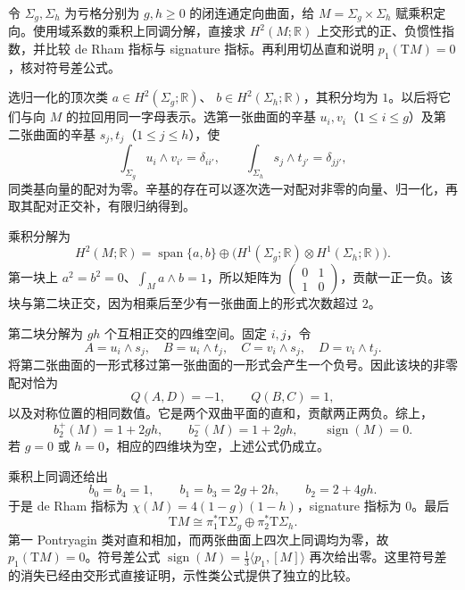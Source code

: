 \begin{optionalexercise}\label{g3:ex:surface-product-signature}
	令 \(\Sigma_g,\Sigma_h\) 为亏格分别为 \(g,h\ge0\) 的闭连通定向曲面，给 \(M=\Sigma_g\times\Sigma_h\) 赋乘积定向。使用域系数的乘积上同调分解，直接求 \(H^2(M;\mathbb R)\) 上交形式的正、负惯性指数，并比较 de Rham 指标与 signature 指标。再利用切丛直和说明 \(p_1(\mathrm TM)=0\)，核对符号差公式。
\end{optionalexercise}
\begin{solution}
	选归一化的顶次类 \(a\in H^2(\Sigma_g;\mathbb R)\)、
	\(b\in H^2(\Sigma_h;\mathbb R)\)，其积分均为 \(1\)。以后将它们与向 \(M\) 的拉回用同一字母表示。选第一张曲面的辛基
	\(u_i,v_i\)（\(1\le i\le g\)）及第二张曲面的辛基
	\(s_j,t_j\)（\(1\le j\le h\)），使
	\[
		\int_{\Sigma_g}u_i\wedge v_{i'}=\delta_{ii'},
		\qquad
		\int_{\Sigma_h}s_j\wedge t_{j'}=\delta_{jj'},
	\]
	同类基向量的配对为零。辛基的存在可以逐次选一对配对非零的向量、归一化，再取其配对正交补，有限归纳得到。

	乘积分解为
	\[
		H^2(M;\mathbb R)
		=\operatorname{span}\{a,b\}
		\oplus
		\bigl(H^1(\Sigma_g;\mathbb R)\otimes H^1(\Sigma_h;\mathbb R)\bigr).
	\]
	第一块上 \(a^2=b^2=0\)、\(\int_Ma\wedge b=1\)，所以矩阵为
	\(\left(\begin{smallmatrix}0&1\\1&0\end{smallmatrix}\right)\)，贡献一正一负。该块与第二块正交，因为相乘后至少有一张曲面上的形式次数超过 \(2\)。

	第二块分解为 \(gh\) 个互相正交的四维空间。固定 \(i,j\)，令
	\[
		A=u_i\wedge s_j,\quad B=u_i\wedge t_j,\quad
		C=v_i\wedge s_j,\quad D=v_i\wedge t_j.
	\]
	将第二张曲面的一形式移过第一张曲面的一形式会产生一个负号。因此该块的非零配对恰为
	\[
		Q(A,D)=-1,\qquad Q(B,C)=1,
	\]
	以及对称位置的相同数值。它是两个双曲平面的直和，贡献两正两负。综上，
	\[
		b_2^+(M)=1+2gh,\qquad b_2^-(M)=1+2gh,
		\qquad\operatorname{sign}(M)=0.
	\]
	若 \(g=0\) 或 \(h=0\)，相应的四维块为空，上述公式仍成立。

	乘积上同调还给出
	\[
		b_0=b_4=1,\qquad b_1=b_3=2g+2h,\qquad b_2=2+4gh.
	\]
	于是 de Rham 指标为
	\(\chi(M)=4(1-g)(1-h)\)，signature 指标为 \(0\)。最后
	\[
		\mathrm TM\cong
		\pi_1^*\mathrm T\Sigma_g\oplus\pi_2^*\mathrm T\Sigma_h.
	\]
	第一 Pontryagin 类对直和相加，而两张曲面上四次上同调均为零，故 \(p_1(\mathrm TM)=0\)。符号差公式
	\(\operatorname{sign}(M)=\frac13\langle p_1,[M]\rangle\)
	再次给出零。这里符号差的消失已经由交形式直接证明，示性类公式提供了独立的比较。
\end{solution}

